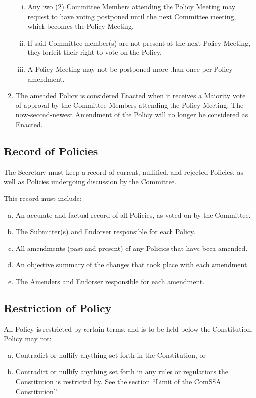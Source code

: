 \documentclass[a4paper,12pt]{article}
\begin{document}
\begin{enumerate}[1)]
\begin{enumerate}[i)]
		\item Any two (2) Committee Members attending the Policy Meeting may request to have voting postponed until the next Committee meeting, which becomes the Policy Meeting.
		\item If said Committee member(s) are not present at the next Policy Meeting, they forfeit their right to vote on the Policy.
		\item A Policy Meeting may not be postponed more than once per Policy amendment.
	\end{enumerate}
	\item The amended Policy is considered Enacted when it receives a Majority vote of approval by the Committee Members attending the Policy Meeting. The now-second-newest Amendment of the Policy will no longer be considered as Enacted.
\end{enumerate}

\subsection{Record of Policies}

The Secretary must keep a record of current, nullified, and rejected Policies, as well as Policies undergoing discussion by the Committee.

This record must include:

\begin{enumerate}[a)]
	\item An accurate and factual record of all Policies, as voted on by the Committee.
	\item The Submitter(s) and Endorser responsible for each Policy.
	\item All amendments (past and present) of any Policies that have been amended.
	\item An objective summary of the changes that took place with each amendment.
	\item The Amenders and Endorser responsible for each amendment.
\end{enumerate}

\subsection{Restriction of Policy}

All Policy is restricted by certain terms, and is to be held below the Constitution. Policy may not:

\begin{enumerate}[a)]
	\item Contradict or nullify anything set forth in the Constitution, or
	\item Contradict or nullify anything set forth in any rules or regulations the Constitution is restricted by. See the section ``Limit of the ComSSA Constitution''.
\end{enumerate}
\end{document}
